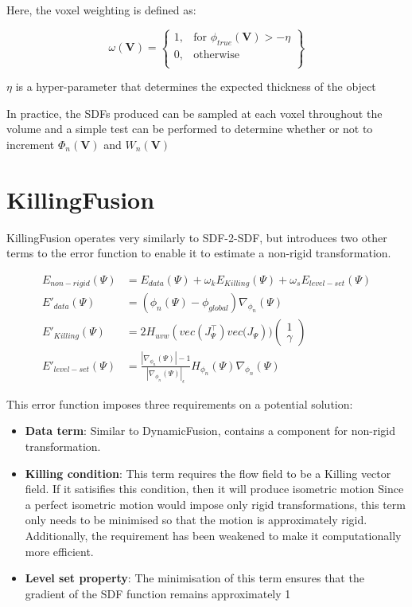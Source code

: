 \documentclass[12pt,twoside]{report}
\begin{document}
Here, the voxel weighting is defined as:

\[
    \omega(\textbf{V}) = \left\{\begin{array}{lr}
    1, & \text{for } \phi_{true}(\textbf{V}) > - \eta\\
    0, & \text{otherwise}\\
    \end{array}\right\}
\]

$\eta$ is a hyper-parameter that determines the expected thickness of the object 

In practice, the SDFs produced can be sampled at each voxel throughout the volume and a simple test can be performed to determine whether or not to increment $\Phi_n(\textbf{V})$ and $W_n(\textbf{V})$

\section{KillingFusion}

KillingFusion operates very similarly to SDF-2-SDF, but introduces two other terms to the error function to enable it to estimate a non-rigid transformation.

\begin{align*}
E_{non-rigid}(\Psi) &= E_{data}(\Psi) + \omega_kE_{Killing}(\Psi) + \omega_sE_{level-set}(\Psi)\\
E'_{data}(\Psi) &= (\phi_n(\Psi) - \phi_{global}) \nabla_{\phi_n}(\Psi)\\
E'_{Killing}(\Psi) &= 2H_{uvw}(vec(J^{\top}_{\Psi}) vec\big(J_{\Psi})\big)\begin{pmatrix}1\\\gamma \end{pmatrix}\\
E'_{level-set}(\Psi) &= \frac{|\nabla_{\phi_n}(\Psi)| - 1}{|\nabla_{\phi_n}(\Psi)|_\epsilon}H_{\phi_n}(\Psi)\nabla_{\phi_n}(\Psi)
\end{align*}

This error function imposes three requirements on a potential solution:
\begin{itemize}
\item \textbf{Data term}: Similar to DynamicFusion, contains a component for non-rigid transformation.
\item \textbf{Killing condition}: This term requires the flow field to be a Killing vector field. If it satisifies this condition, then it will produce isometric motion Since a perfect isometric motion would impose only rigid transformations, this term only needs to be minimised so that the motion is approximately rigid. Additionally, the requirement has been weakened to make it computationally more efficient.
\item \textbf{Level set property}: The minimisation of this term ensures that the gradient of the SDF function remains approximately 1
\end{itemize}
\end{document}
